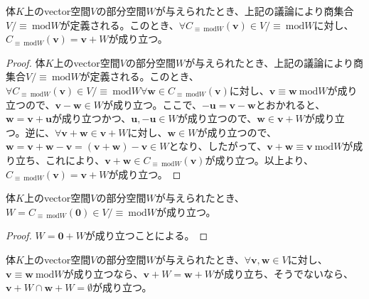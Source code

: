 \documentclass[dvipdfmx]{jsarticle}
\begin{document}
\begin{thm}\label{2.4.1.10}
体$K$上のvector空間$V$の部分空間$W$が与えられたとき、上記の議論により商集合${V}/{\equiv \ \mathrm{mod}W}$が定義される。このとき、$\forall C_{\equiv \ \mathrm{mod}W}\left( \mathbf{v} \right) \in {V}/{\equiv \ \mathrm{mod}W}$に対し、$C_{\equiv \ \mathrm{mod}W}\left( \mathbf{v} \right) = \mathbf{v} + W$が成り立つ。
\end{thm}
\begin{proof}
体$K$上のvector空間$V$の部分空間$W$が与えられたとき、上記の議論により商集合${V}/{\equiv \ \mathrm{mod}W}$が定義される。このとき、$\forall C_{\equiv \ \mathrm{mod}W}\left( \mathbf{v} \right) \in {V}/{\equiv \ \mathrm{mod}W}\forall\mathbf{w} \in C_{\equiv \ \mathrm{mod}W}\left( \mathbf{v} \right)$に対し、$\mathbf{v} \equiv \mathbf{w}\ \mathrm{mod}W$が成り立つので、$\mathbf{v} - \mathbf{w} \in W$が成り立つ。ここで、$- \mathbf{u} = \mathbf{v} - \mathbf{w}$とおかれると、$\mathbf{w} = \mathbf{v} + \mathbf{u}$が成り立つかつ、$\mathbf{u}, - \mathbf{u} \in W$が成り立つので、$\mathbf{w} \in \mathbf{v} + W$が成り立つ。逆に、$\forall\mathbf{v} + \mathbf{w} \in \mathbf{v} + W$に対し、$\mathbf{w} \in W$が成り立つので、$\mathbf{w} = \mathbf{v} + \mathbf{w} - \mathbf{v} = \left( \mathbf{v} + \mathbf{w} \right) - \mathbf{v} \in W$となり、したがって、$\mathbf{v} + \mathbf{w} \equiv \mathbf{v}\ \mathrm{mod}W$が成り立ち、これにより、$\mathbf{v} + \mathbf{w} \in C_{\equiv \ \mathrm{mod}W}\left( \mathbf{v} \right)$が成り立つ。以上より、$C_{\equiv \ \mathrm{mod}W}\left( \mathbf{v} \right) = \mathbf{v} + W$が成り立つ。
\end{proof}
\begin{thm}\label{2.4.1.11}
体$K$上のvector空間$V$の部分空間$W$が与えられたとき、$W = C_{\equiv \ \mathrm{mod}W}\left( \mathbf{0} \right) \in {V}/{\equiv \ \mathrm{mod}W}$が成り立つ。
\end{thm}
\begin{proof} $W = \mathbf{0} + W$が成り立つことによる。
\end{proof}
\begin{thm}\label{2.4.1.12}
体$K$上のvector空間$V$の部分空間$W$が与えられたとき、$\forall\mathbf{v},\mathbf{w} \in V$に対し、$\mathbf{v} \equiv \mathbf{w}\ \mathrm{mod}W$が成り立つなら、$\mathbf{v} + W = \mathbf{w} + W$が成り立ち、そうでないなら、$\mathbf{v} + W \cap \mathbf{w} + W = \emptyset$が成り立つ。
\end{thm}
\end{document}
